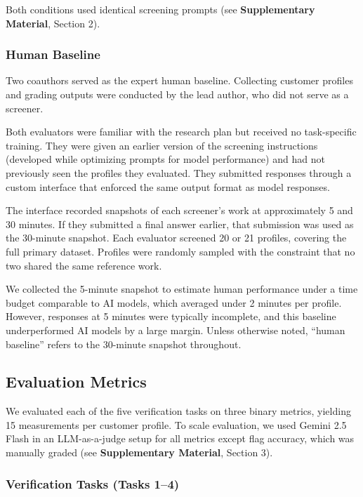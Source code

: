 \documentclass[utf8]{FrontiersinHarvard}
\begin{document}
Both conditions used identical screening prompts (see \textbf{Supplementary Material}, Section 2).

\subsubsection{Human Baseline}

Two coauthors served as the expert human baseline. Collecting customer profiles and grading outputs were conducted by the lead author, who did not serve as a screener.

Both evaluators were familiar with the research plan but received no task-specific training. They were given an earlier version of the screening instructions (developed while optimizing prompts for model performance) and had not previously seen the profiles they evaluated. They submitted responses through a custom interface that enforced the same output format as model responses.

The interface recorded snapshots of each screener's work at approximately 5 and 30 minutes. If they submitted a final answer earlier, that submission was used as the 30-minute snapshot. Each evaluator screened 20 or 21 profiles, covering the full primary dataset. Profiles were randomly sampled with the constraint that no two shared the same reference work.

We collected the 5-minute snapshot to estimate human performance under a time budget comparable to AI models, which averaged under 2 minutes per profile. However, responses at 5 minutes were typically incomplete, and this baseline underperformed AI models by a large margin. Unless otherwise noted, ``human baseline'' refers to the 30-minute snapshot throughout.

\subsection{Evaluation Metrics}

We evaluated each of the five verification tasks on three binary metrics, yielding 15 measurements per customer profile. To scale evaluation, we used Gemini 2.5 Flash in an LLM-as-a-judge setup for all metrics except flag accuracy, which was manually graded (see \textbf{Supplementary Material}, Section 3).

\subsubsection{Verification Tasks (Tasks 1--4)}
\end{document}
